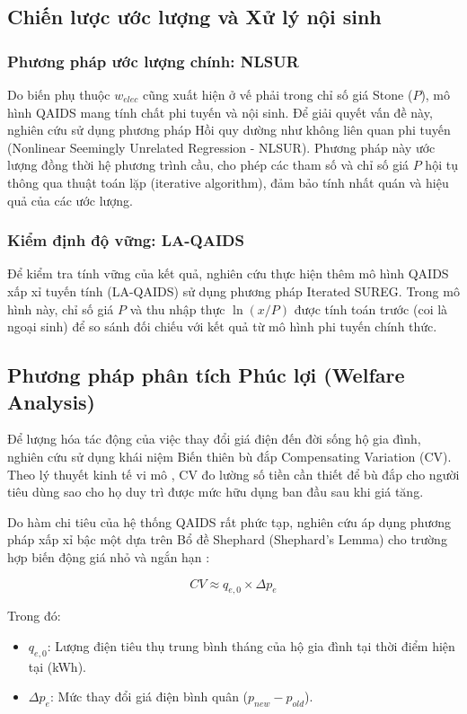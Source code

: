\documentclass[12pt,a4paper,oneside]{article}
\begin{document}
\subsection{Chiến lược ước lượng và Xử lý nội sinh}

\subsubsection{Phương pháp ước lượng chính: NLSUR}
Do biến phụ thuộc $w_{elec}$ cũng xuất hiện ở vế phải trong chỉ số giá Stone ($P$), mô hình QAIDS mang tính chất phi tuyến và nội sinh. Để giải quyết vấn đề này, nghiên cứu sử dụng phương pháp Hồi quy dường như không liên quan phi tuyến (Nonlinear Seemingly Unrelated Regression - NLSUR). Phương pháp này ước lượng đồng thời hệ phương trình cầu, cho phép các tham số và chỉ số giá $P$ hội tụ thông qua thuật toán lặp (iterative algorithm), đảm bảo tính nhất quán và hiệu quả của các ước lượng.

\subsubsection{Kiểm định độ vững: LA-QAIDS}
Để kiểm tra tính vững của kết quả, nghiên cứu thực hiện thêm mô hình QAIDS xấp xỉ tuyến tính (LA-QAIDS) sử dụng phương pháp Iterated SUREG. Trong mô hình này, chỉ số giá $P$ và thu nhập thực $\ln(x/P)$ được tính toán trước (coi là ngoại sinh) để so sánh đối chiếu với kết quả từ mô hình phi tuyến chính thức.

\subsection{Phương pháp phân tích Phúc lợi (Welfare Analysis)}
Để lượng hóa tác động của việc thay đổi giá điện đến đời sống hộ gia đình, nghiên cứu sử dụng khái niệm Biến thiên bù đắp Compensating Variation (CV). Theo lý thuyết kinh tế vi mô \parencite{varian1992}, CV đo lường số tiền cần thiết để bù đắp cho người tiêu dùng sao cho họ duy trì được mức hữu dụng ban đầu sau khi giá tăng.

Do hàm chi tiêu của hệ thống QAIDS rất phức tạp, nghiên cứu áp dụng phương pháp xấp xỉ bậc một dựa trên Bổ đề Shephard (Shephard's Lemma) cho trường hợp biến động giá nhỏ và ngắn hạn \parencite{banks1997}:

\begin{equation}
	CV \approx q_{e,0} \times \Delta p_e
\end{equation}

Trong đó:
\begin{itemize}
	\item $q_{e,0}$: Lượng điện tiêu thụ trung bình tháng của hộ gia đình tại thời điểm hiện tại (kWh).
	\item $\Delta p_e$: Mức thay đổi giá điện bình quân ($p_{new} - p_{old}$).
\end{itemize}
\end{document}

